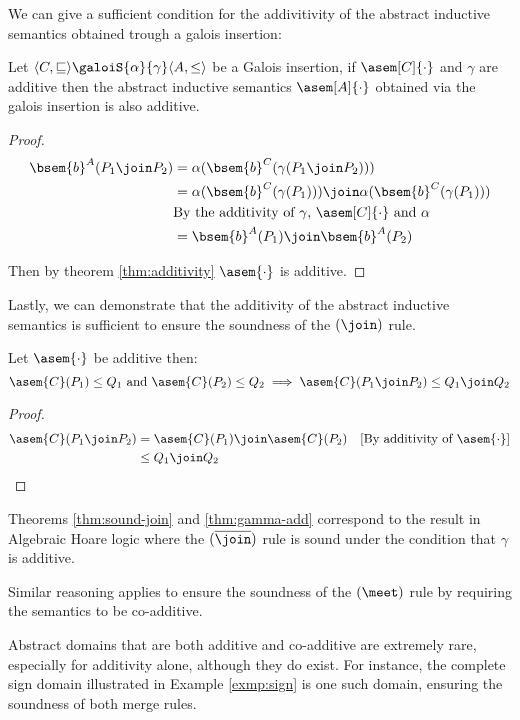 We can give a sufficient condition for the addivitivity of the abstract 
inductive semantics obtained trough a galois insertion:
\begin{theorem}
  \label{thm:gamma-add}
  Let $\langle C, \sqsubseteq \rangle \galoiS{\alpha}{\gamma} \langle A, \leq 
  \rangle$ be a Galois insertion, if $\asem[C]{\cdot}$ and $\gamma$ are 
  additive then the abstract inductive semantics $\asem[A]{\cdot}$ obtained
  via the galois insertion is also additive.
\end{theorem}
\begin{proof}
  \begin{align*}
    \bsem{b}^A(P_1 \join P_2)
      &= \alpha(\bsem{b}^C(\gamma(P_1 \join P_2))) \\
      &= \alpha(\bsem{b}^C(\gamma(P_1))) \join\alpha(\bsem{b}^C(\gamma(P_1))) \\
      &\text{By the additivity of $\gamma$, $\asem[C]{\cdot}$ and $\alpha$}\\
      &= \bsem{b}^A(P_1) \join \bsem{b}^A(P_2)
  \end{align*}

  Then by theorem \ref{thm:additivity} $\asem{\cdot}$ is additive.
\end{proof}

Lastly, we can demonstrate that the additivity of the abstract inductive
semantics is sufficient to ensure the soundness of the $(\join)$ rule.

\begin{theorem}
  \label{thm:sound-join}
  Let $\asem{\cdot}$ be additive then:
  $$\asem{C}(P_1) \leq Q_1 \text{ and } \asem{C}(P_2) \leq Q_2 \implies
  \asem{C}(P_1 \join P_2) \leq Q_1 \join Q_2$$
\end{theorem}
\begin{proof}
  \begin{align*}
    \asem{C}(P_1 \join P_2)
      &= \asem{C}(P_1) \join \asem{C}(P_2)
      &\text{[By additivity of $\asem{\cdot}$]} \\
      &\leq Q_1 \join Q_2
  \end{align*}
\end{proof}

Theorems \ref{thm:sound-join} and \ref{thm:gamma-add} correspond to the result
in Algebraic Hoare logic where the $(\overline{\join})$ rule is sound under the
condition that $\gamma$ is additive.

Similar reasoning applies to ensure the soundness of the $(\meet)$ rule by
requiring the semantics to be co-additive.

Abstract domains that are both additive and co-additive are extremely rare,
especially for additivity alone, although they do exist. For instance, the
complete sign domain illustrated in Example \ref{exmp:sign} is one such domain,
ensuring the soundness of both merge rules.
